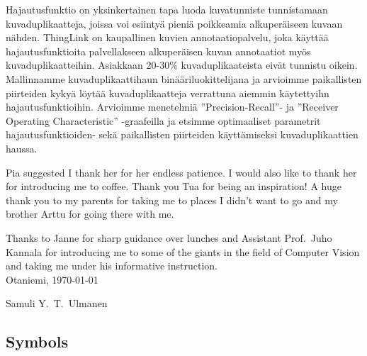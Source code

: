 \documentclass[english,12pt,a4paper,pdftex,elec,utf8, table]{aaltothesis}
\begin{document}
\begin{abstractpage}[finnish]
Hajautusfunktio on yksinkertainen tapa luoda kuvatunniste tunnistamaan kuvaduplikaatteja, joissa voi esiintyä pieniä poikkeamia alkuperäiseen kuvaan nähden. ThingLink on kaupallinen kuvien annotaatiopalvelu, joka käyttää hajautusfunktioita palvellakseen alkuperäisen kuvan annotaatiot myös kuvaduplikaatteihin. Asiakkaan 20-30\% kuvaduplikaateista eivät tunnistu oikein. Mallinnamme kuvaduplikaattihaun binääriluokittelijana ja arvioimme paikallisten piirteiden kykyä löytää kuvaduplikaatteja verrattuna aiemmin käytettyihn hajautusfunktioihin. Arvioimme menetelmiä ''Precision-Recall''- ja ''Receiver Operating Characteristic'' -graafeilla ja etsimme optimaaliset parametrit hajautusfunktioiden- sekä paikallisten piirteiden käyttämiseksi kuvaduplikaattien haussa.
\end{abstractpage}

\newpage

Pia suggested I thank her for her endless patience. I would also like to thank her for introducing me to coffee. Thank you Tua for being an inspiration! A huge thank you to my parents for taking me to places I didn't want to go and my brother Arttu for going there with me.

Thanks to Janne for sharp guidance over lunches and Assistant Prof.\ Juho Kannala for introducing me to some of the giants in the field of Computer Vision and taking me under his informative instruction.\\

\vspace{5cm}
Otaniemi, \today

\vspace{5mm}
{\hfill Samuli Y.\ T.\ Ulmanen \hspace{1cm}}

\newpage


\thesistableofcontents


\subsection*{Symbols}
\end{document}
